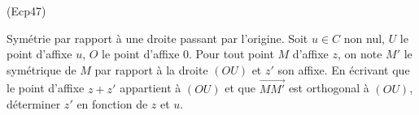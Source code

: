 \begin{tiny}(Ecp47)\end{tiny} Symétrie par rapport à une droite passant par l'origine.\newline
Soit $u\in C$ non nul, $U$ le point d'affixe $u$, $O$ le point d'affixe $0$. Pour tout point $M$ d'affixe $z$, on note $M'$ le symétrique de $M$ par rapport à la droite $(OU)$ et $z'$ son affixe.\newline
En écrivant que le point d'affixe $z+z'$ appartient à $(OU)$ et que $\overrightarrow{MM'}$ est orthogonal à $(OU)$, déterminer $z'$ en fonction de $z$ et $u$.
